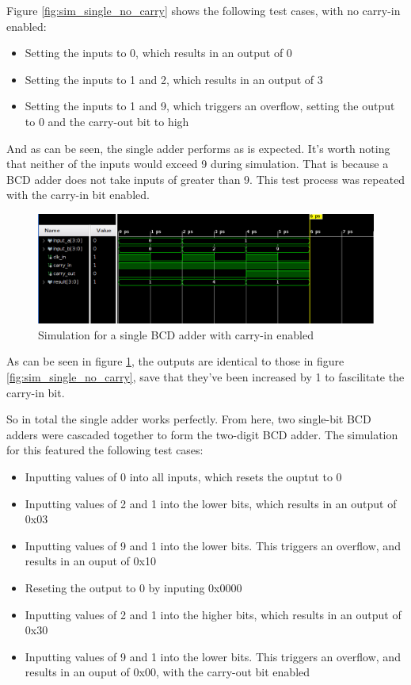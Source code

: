\documentclass[12pt,a4paper]{article}
\begin{document}
Figure \ref{fig:sim_single_no_carry} shows the following test cases, with no carry-in enabled:

\begin{itemize}
    \item Setting the inputs to 0, which results in an output of 0
    \item Setting the inputs to 1 and 2, which results in an output of 3
    \item Setting the inputs to 1 and 9, which triggers an overflow, setting the output to 0 and the carry-out bit to high
\end{itemize}

And as can be seen, the single adder performs as is expected. It's worth noting that neither of the inputs would exceed 9 during simulation. That is because a BCD adder does not take inputs of greater than 9. This test process was repeated with the carry-in bit enabled.

\begin{figure}[H]
    \centering
    \includegraphics[scale=0.25]{images/sim_single_carry.png}
    \caption{Simulation for a single BCD adder with carry-in enabled}
    \label{fig:sim_single_carry}
\end{figure}

As can be seen in figure \ref{fig:sim_single_carry}, the outputs are identical to those in figure \ref{fig:sim_single_no_carry}, save that they've been increased by 1 to fascilitate the carry-in bit.

So in total the single adder works perfectly. From here, two single-bit BCD adders were cascaded together to form the two-digit BCD adder. The simulation for this featured the following test cases:

\begin{itemize}
    \item Inputting values of 0 into all inputs, which resets the ouptut to 0
    \item Inputting values of 2 and 1 into the lower bits, which results in an output of 0x03
    \item Inputting values of 9 and 1 into the lower bits. This triggers an overflow, and results in an ouput of 0x10
    \item Reseting the output to 0 by inputing 0x0000
    \item Inputting values of 2 and 1 into the higher bits, which results in an output of 0x30
    \item Inputting values of 9 and 1 into the lower bits. This triggers an overflow, and results in an ouput of 0x00, with the carry-out bit enabled
\end{itemize}
\end{document}
